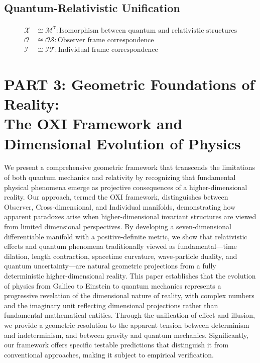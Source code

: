 \documentclass{article}
\begin{document}
\subsection{Quantum-Relativistic Unification}
\begin{align}
\mathcal{X} &\cong \mathcal{M}^7 : \text{Isomorphism between quantum and relativistic structures} \\
\mathcal{O} &\cong \mathcal{OS} : \text{Observer frame correspondence} \\
\mathcal{I} &\cong \mathcal{IT} : \text{Individual frame correspondence}
\end{align}







\section{PART 3: Geometric Foundations of Reality: \\
The OXI Framework and Dimensional Evolution of Physics}
We present a comprehensive geometric framework that transcends the limitations of both quantum mechanics and relativity by recognizing that fundamental physical phenomena emerge as projective consequences of a higher-dimensional reality. Our approach, termed the OXI framework, distinguishes between Observer, Cross-dimensional, and Individual manifolds, demonstrating how apparent paradoxes arise when higher-dimensional invariant structures are viewed from limited dimensional perspectives. By developing a seven-dimensional differentiable manifold with a positive-definite metric, we show that relativistic effects and quantum phenomena traditionally viewed as fundamental—time dilation, length contraction, spacetime curvature, wave-particle duality, and quantum uncertainty—are natural geometric projections from a fully deterministic higher-dimensional reality. This paper establishes that the evolution of physics from Galileo to Einstein to quantum mechanics represents a progressive revelation of the dimensional nature of reality, with complex numbers and the imaginary unit reflecting dimensional projections rather than fundamental mathematical entities. Through the unification of effect and illusion, we provide a geometric resolution to the apparent tension between determinism and indeterminism, and between gravity and quantum mechanics. Significantly, our framework offers specific testable predictions that distinguish it from conventional approaches, making it subject to empirical verification.
\end{document}
